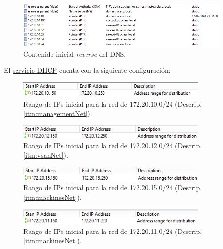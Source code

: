         \begin{figure}[h!]
            \centering
            \includegraphics[width=0.95\textwidth]{imaxes/probaConcepto/dnsINICIOReverse.png}
            \caption{Contenido inicial \textit{reverse} del DNS.} 
            \label{fig:contenidoinicialReverseDNS}
        \end{figure}
        \FloatBarrier
El \underline{servicio DHCP} cuenta con la siguiente configuración:
        \begin{figure}[h!]
            \centering
            \includegraphics[width=0.85\textwidth]{imaxes/probaConcepto/scope1722010Inicio.png}
            \caption{Rango de IPs inicial para la red de 172.20.10.0/24 (Descrip. \ref{itm:managementNet}).} 
            \label{fig:dhcpInicioManage}
        \end{figure}
        \begin{figure}[h!]
            \centering
            \includegraphics[width=0.85\textwidth]{imaxes/probaConcepto/scope1722012Inicio.png}
            \caption{Rango de IPs inicial para la red de 172.20.12.0/24 (Descrip. \ref{itm:vsanNet}).} 
            \label{fig:dhcpInicioSAN}
        \end{figure}
        \begin{figure}[h!]
            \centering
            \includegraphics[width=0.85\textwidth]{imaxes/probaConcepto/scope1722015Inicio.png}
            \caption{Rango de IPs inicial para la red de 172.20.15.0/24 (Descrip. \ref{itm:machinesNet}).} 
            \label{fig:dhcpInicioMachines}
        \end{figure}
    \iffalse
        \begin{figure}[h!]
            \centering
            \includegraphics[width=0.85\textwidth]{imaxes/probaConcepto/scope1722011Inicio.png}
            \caption{Rango de IPs inicial para la red de 172.20.11.0/24 (Descrip. \ref{itm:machinesNet}).} 
            \label{fig:dhcpInicioMachines}
        \end{figure}
